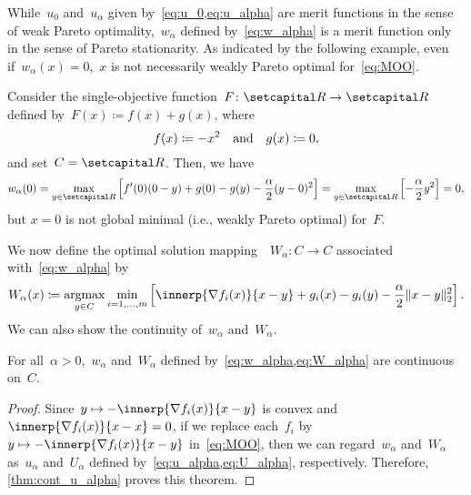 \documentclass[../../main]{subfiles}
\begin{document}
            While~$u_0$ and~$u_\alpha$ given by~\cref{eq:u_0,eq:u_alpha} are merit functions in the sense of weak Pareto optimality,~$w_\alpha$ defined by~\cref{eq:w_alpha} is a merit function only in the sense of Pareto stationarity.
            As indicated by the following example, even if~$w_\alpha(x) = 0$,~$x$ is not necessarily weakly Pareto optimal for~\cref{eq:MOO}.
            \begin{example}
                Consider the single-objective function~$F\colon \setR \to \setR$ defined by~$F(x) \coloneqq f(x) + g(x)$, where
                \[
                    f(x) \coloneqq - x^2 \quad \text{and} \quad g(x) \coloneqq 0
                ,\]
                and set~$C = \setR$.
                Then, we have
                \[
                    w_\alpha(0) = \max_{y \in \setR} \left[ f'(0) (0 - y) + g(0) - g(y) - \frac{\alpha}{2} (y - 0)^2 \right] 
                    = \max_{y \in \setR} \left[ - \frac{\alpha}{2} y^2 \right] = 0
                ,\] 
                but $x = 0$ is not global minimal (i.e., weakly Pareto optimal) for~$F$.
            \end{example}

            We now define the optimal solution mapping~~$W_\alpha \colon C \to C$ associated with~\cref{eq:w_alpha} by
            \begin{equation} \label{eq:W_alpha}
                W_\alpha(x) \coloneqq \argmax_{y \in C} \min_{i = 1, \dots, m} \left[ \innerp{\nabla f_i(x)}{x - y} + g_i(x) - g_i(y) - \frac{\alpha}{2} \norm{x - y}_2^2 \right] 
            .\end{equation} 
            We can also show the continuity of~$w_\alpha$ and~$W_\alpha$.
            \begin{theorem}
                For all~$\alpha > 0$,~$w_\alpha$ and~$W_\alpha$ defined by~\cref{eq:w_alpha,eq:W_alpha} are continuous on~$C$.
            \end{theorem}
            \begin{proof}
                Since~$y \mapsto - \innerp{\nabla f_i(x)}{x - y}$ is convex and~$\innerp{\nabla f_i(x)}{x - x} = 0$, if we replace each~$f_i$ by~$y \mapsto - \innerp{\nabla f_i(x)}{x - y}$ in~\cref{eq:MOO}, then we can regard~$w_\alpha$ and~$W_\alpha$ as~$u_\alpha$ and~$U_\alpha$ defined by~\cref{eq:u_alpha,eq:U_alpha}, respectively.
                Therefore, \cref{thm:cont_u_alpha} proves this theorem.
            \end{proof}
\end{document}
